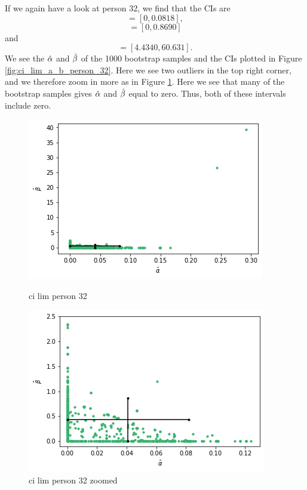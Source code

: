 If we again have a look at person 32, we find that the CIs are
\begin{equation*}
    [\hat{\alpha}^{*(5)}_{1000},\hat{\alpha}^{*(95)}_{1000}] = [0,0.0818],
\end{equation*}
\begin{equation*}
    [\hb^{*(5)}_{1000},\hb^{*(95)}_{1000}] = [0,0.8690]
\end{equation*}
and
\begin{equation*}
    [\hat{\eta}^{*(5)}_{1000},\hat{\eta}^{*(95)}_{1000}] = [4.4340,60.631].
\end{equation*}
We see the $\hat{\alpha}$ and $\hat{\beta}$ of the 1000 bootstrap samples and the CIs plotted in Figure \ref{fig:ci_lim_a_b_person_32}. Here we see two outliers in the top right corner, and we therefore zoom in more as in Figure \ref{fig:ci_lim_a_b_person_32_zoomed}. Here we see that many of the bootstrap samples gives $\hat{\alpha}$ and $\hat{\beta}$ equal to zero. Thus, both of these intervals include zero. 
\begin{figure}
    \centering
    \begin{minipage}{0.48\textwidth}
        \centering
        \includegraphics[scale=0.37]{pictures/ci_lim_a_b_person32.png}
        \caption{ci lim person 32}
        \label{fig:ci_lim_a_b_person_32}
    \end{minipage}\hfill
    \begin{minipage}{0.48\textwidth}
        \centering
        \includegraphics[scale=0.37]{pictures/ci_lim_a_b_person32_zoomed.png}
        \caption{ci lim person 32 zoomed}
        \label{fig:ci_lim_a_b_person_32_zoomed}
    \end{minipage}
\end{figure}
